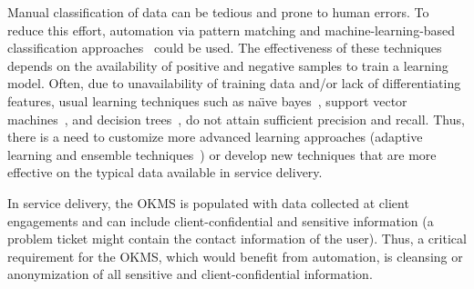 Manual classification of data can be tedious and prone to human errors. To
reduce this effort, automation via pattern matching and machine-learning-based
classification approaches~\cite{bishop2006pattern} could be used.  The
effectiveness of these techniques depends on the availability of positive and
negative samples to train a learning model. Often, due to unavailability of
training data and/or lack of differentiating features, usual learning techniques
such as na\"{\i}ve bayes~\cite{}, support vector machines~\cite{}, and decision
trees~\cite{}, do not attain sufficient precision and recall. Thus, there is a
need to customize more advanced learning approaches (\eg adaptive learning and
ensemble techniques~\cite{}) or develop new techniques that are more effective
on the typical data available in service delivery.


In service delivery, the OKMS is populated with data collected at client
engagements and can include client-confidential and sensitive information (\eg a
problem ticket might contain the contact information of the user). Thus, a
critical requirement for the OKMS, which would benefit from automation, is
cleansing or anonymization of all sensitive and client-confidential information.

